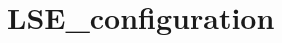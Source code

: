 \hypertarget{group___l_s_e__configuration}{\section{L\-S\-E\-\_\-configuration}
\label{group___l_s_e__configuration}
}
